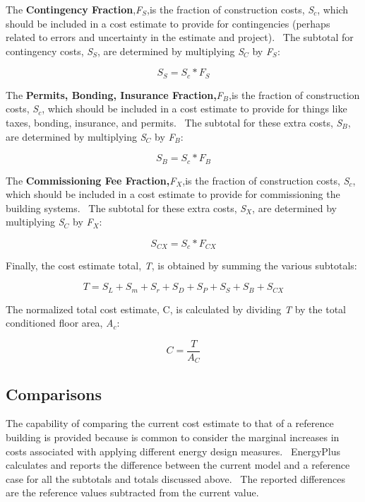 The \textbf{Contingency Fraction},\emph{F\(_{S}\)},is the fraction of construction costs, \emph{S\(_{c}\)}, which should be included in a cost estimate to provide for contingencies (perhaps related to errors and uncertainty in the estimate and project).~ The subtotal for contingency costs, \emph{S\(_{S}\)}, are determined by multiplying \emph{S\(_{C}\)} by \emph{F\(_{S}\)}:

\begin{equation}
{S_S} = {S_c}*{F_S}
\end{equation}

The \textbf{Permits, Bonding, Insurance Fraction,}\emph{F\(_{B}\)},is the fraction of construction costs, \emph{S\(_{c}\)}, which should be included in a cost estimate to provide for things like taxes, bonding, insurance, and permits.~ The subtotal for these extra costs, \emph{S\(_{B}\)}, are determined by multiplying \emph{S\(_{C}\)} by \emph{F\(_{B}\)}:

\begin{equation}
{S_B} = {S_c}*{F_B}
\end{equation}

The \textbf{Commissioning Fee Fraction,}\emph{F\(_{X}\)},is the fraction of construction costs, \emph{S\(_{c}\)}, which should be included in a cost estimate to provide for commissioning the building systems.~ The subtotal for these extra costs, \emph{S\(_{X}\)}, are determined by multiplying \emph{S\(_{C}\)} by \emph{F\(_{X}\)}:

\begin{equation}
{S_{CX}} = {S_c}*{F_{CX}}
\end{equation}

Finally, the cost estimate total, \emph{T}, is obtained by summing the various subtotals:

\begin{equation}
T = {S_L} + {S_m} + {S_r} + {S_D} + {S_P} + {S_S} + {S_B} + {S_{CX}}
\end{equation}

The normalized total cost estimate, C, is calculated by dividing \emph{T} by the total conditioned floor area, \emph{A\(_{c}\)}:

\begin{equation}
C = \frac{T}{{{A_C}}}
\end{equation}

\subsection{Comparisons}\label{comparisons}

The capability of comparing the current cost estimate to that of a reference building is provided because is common to consider the marginal increases in costs associated with applying different energy design measures.~ EnergyPlus calculates and reports the difference between the current model and a reference case for all the subtotals and totals discussed above.~ The reported differences are the reference values subtracted from the current value.
